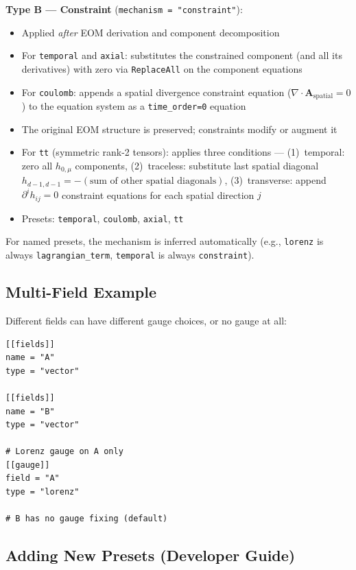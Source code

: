 \textbf{Type B --- Constraint} (\texttt{mechanism = "constraint"}):

\begin{itemize}
  \item Applied \emph{after} EOM derivation and component decomposition
  \item For \texttt{temporal} and \texttt{axial}: substitutes the constrained component (and all its
    derivatives) with zero via \texttt{ReplaceAll} on the component equations
  \item For \texttt{coulomb}: appends a spatial divergence constraint equation
    ($\nabla \cdot \mathbf{A}_\text{spatial} = 0$) to the equation system as a \texttt{time\_order=0} equation
  \item The original EOM structure is preserved; constraints modify or augment it
  \item For \texttt{tt} (symmetric rank-2 tensors): applies three conditions ---
    (1)~temporal: zero all $h_{0,\mu}$ components,
    (2)~traceless: substitute last spatial diagonal $h_{d-1,d-1} = -(\text{sum of other spatial diagonals})$,
    (3)~transverse: append $\partial^i h_{ij} = 0$ constraint equations for each spatial direction $j$
  \item Presets: \texttt{temporal}, \texttt{coulomb}, \texttt{axial}, \texttt{tt}
\end{itemize}

For named presets, the mechanism is inferred automatically (e.g., \texttt{lorenz}
is always \texttt{lagrangian\_term}, \texttt{temporal} is always \texttt{constraint}).

\subsection{Multi-Field Example}
\label{sec:gauge-multi-field}

Different fields can have different gauge choices, or no gauge at all:

\begin{lstlisting}[style=toml]
[[fields]]
name = "A"
type = "vector"

[[fields]]
name = "B"
type = "vector"

# Lorenz gauge on A only
[[gauge]]
field = "A"
type = "lorenz"

# B has no gauge fixing (default)
\end{lstlisting}

\subsection{Adding New Presets (Developer Guide)}
\label{sec:gauge-developer}

